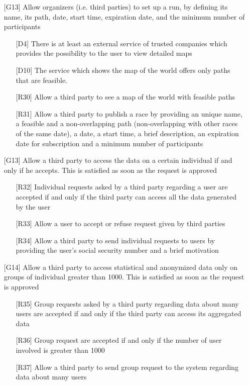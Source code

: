 \begin{itemize}
\begin{itemize}
	\end{itemize}
\item[{[G13]}] Allow organizers (i.e. third parties) to set up a run, by defining its name, its path, date, start time, expiration date, and the minimum number of participants
	\begin{itemize}
	\item[{[D4]}] There is at least an external service of trusted companies which provides the possibility to the user to view detailed maps
	\item[{[D10]}] The service which shows the map of the world offers only paths that are feasible.
	\item[{[R30]}] Allow a third party to see a map of the world with feasible paths
	\item[{[R31]}] Allow a third party to publish a race by providing an unique name, a feasible and a non-overlapping path (non-overlapping with other races of the same date), a date, a start time, a brief description, an expiration date for subscription and a minimum number of participants
	\end{itemize}
\item[{[G13]}] Allow a third party to access the data on a certain individual if and only if he accepts. This is satisfied as soon as the request is approved
	\begin{itemize}
	\item[{[R32]}] Individual requests asked by a third party regarding a user are accepted if and only if the third party can access all the data generated by the user
	\item[{[R33]}] Allow a user to accept or refuse request given by third parties
	\item[{[R34]}] Allow a third party to send individual requests to users by providing the user's social security number and a brief motivation
	\end{itemize}
\item[{[G14]}] Allow a third party to access statistical and anonymized data only on groups of individual greater than 1000. This is satisfied as soon as the request is approved
	\begin{itemize}
	\item[{[R35]}] Group requests asked by a third party regarding data about many users are accepted if and only if the third party can access its aggregated data
	\item[{[R36]}] Group request are accepted if and only if the number of user involved is greater than 1000
	\item[{[R37]}] Allow a third party to send group request to the system regarding data about many users

\end{itemize}
\end{itemize}
